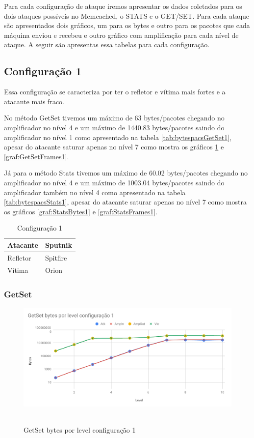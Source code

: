 Para cada configuração de ataque iremos apresentar os dados coletados para os dois ataques possíveis no Memcached, o STATS e o GET/SET. Para cada ataque são apresentados dois gráficos, um para os bytes e outro para os pacotes que cada máquina enviou e recebeu e outro gráfico com amplificação para cada nível de ataque. A seguir são apresentas essa tabelas para cada configuração. 

\subsection*{Configuração 1}

Essa configuração se caracteriza por ter o refletor e vítima mais fortes e a atacante mais fraco. 

No método GetSet tivemos um máximo de 63 bytes/pacotes chegando no amplificador no nível 4 e um máximo de 1440.83 bytes/pacotes saindo do amplificador no nível 1 como apresentado na tabela \ref{tab:bytespacsGetSet1}, apesar do atacante saturar apenas no nível 7 como mostra os gráficos \ref{graf:GetSetBytes1} e \ref{graf:GetSetFrames1}.

Já para o método Stats tivemos um máximo de 60.02 bytes/pacotes chegando no amplificador no nível 4 e um máximo de 1003.04 bytes/pacotes saindo do amplificador também no nível 4 como apresentado na tabela \ref{tab:bytespacsStats1}, apesar do atacante saturar apenas no nível 7 como mostra os gráficos \ref{graf:StatsBytes1} e \ref{graf:StatsFrames1}.

\begin{table}[H]
\centering
\caption{Configuração 1}
\begin{tabular}{|l|l|}
\hline
Atacante     & Sputnik  \\ \hline
Refletor     & Spitfire \\ \hline
Vítima       & Orion    \\ \hline
\end{tabular}
\end{table}

\subsubsection{GetSet}

\begin{figure}[H]
     \centering
     \label{graf:GetSetBytes1}
     \includegraphics[scale=0.6]{img/capturas/GetSetBLC1.pdf}\
     \caption{GetSet bytes por level configuração 1}
\end{figure}


